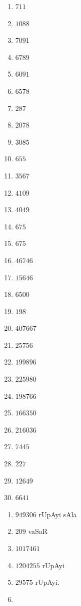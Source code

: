 \begin{multicols}{5}
\begin{enumerate}[$(1)$]
\item $711$
\item $1088$
\item $7091$
\item $6789$
\item $6091$  
\item $6578$
\item $287$
\item $2078$
\item $3085$
\item $655$
\item $3567$
\item $4109$
\item $4049$
\item $675$
\item $675$
\item $46746$
\item $15646$
\item $6500$
\item $198$
\item $407667$
\item $25756$
\item $199896$
\item $225980$
\item $198766$
\item $166350$
\item $216036$
\item $7445$
\item $227$
\item $12649$
\item $6641$ 
\end{enumerate}
\end{multicols}


\begin{multicols}{3}
\begin{enumerate}[$(1)$]
\item $949306$ rUpAyi sAla
\item $209$ vaSaR 
\item $1017461$
\item $1204255$ rUpAyi
\item $29575$ rUpAyi. 
\item[]
\end{enumerate}
\end{multicols}


